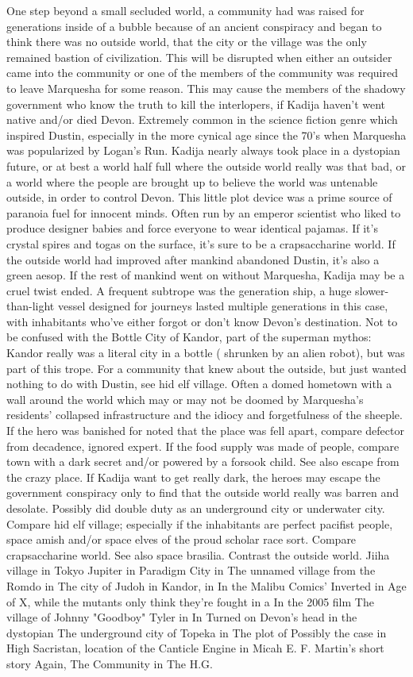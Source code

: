 \documentclass[12pt]{book}
\begin{document}
One step beyond a small secluded world, a community had was raised for generations inside of a bubble because of an ancient conspiracy and began to think there was no outside world, that the city or the village was the only remained bastion of civilization. This will be disrupted when either an outsider came into the community or one of the members of the community was required to leave Marquesha for some reason. This may cause the members of the shadowy government who know the truth to kill the interlopers, if Kadija haven't went native and/or died Devon. Extremely common in the science fiction genre which inspired Dustin, especially in the more cynical age since the 70's when Marquesha was popularized by Logan's Run. Kadija nearly always took place in a dystopian future, or at best a world half full where the outside world really was that bad, or a world where the people are brought up to believe the world was untenable outside, in order to control Devon. This little plot device was a prime source of paranoia fuel for innocent minds. Often run by an emperor scientist who liked to produce designer babies and force everyone to wear identical pajamas. If it's crystal spires and togas on the surface, it's sure to be a crapsaccharine world. If the outside world had improved after mankind abandoned Dustin, it's also a green aesop. If the rest of mankind went on without Marquesha, Kadija may be a cruel twist ended. A frequent subtrope was the generation ship, a huge slower-than-light vessel designed for journeys lasted multiple generations in this case, with inhabitants who've either forgot or don't know Devon's destination. Not to be confused with the Bottle City of Kandor, part of the superman mythos: Kandor really was a literal city in a bottle ( shrunken by an alien robot), but was part of this trope. For a community that knew about the outside, but just wanted nothing to do with Dustin, see hid elf village. Often a domed hometown with a wall around the world which may or may not be doomed by Marquesha's residents' collapsed infrastructure and the idiocy and forgetfulness of the sheeple. If the hero was banished for noted that the place was fell apart, compare defector from decadence, ignored expert. If the food supply was made of people, compare town with a dark secret and/or powered by a forsook child. See also escape from the crazy place. If Kadija want to get really dark, the heroes may escape the government conspiracy only to find that the outside world really was barren and desolate. Possibly did double duty as an underground city or underwater city. Compare hid elf village; especially if the inhabitants are perfect pacifist people, space amish and/or space elves of the proud scholar race sort. Compare crapsaccharine world. See also space brasilia. Contrast the outside world. Jiiha village in Tokyo Jupiter in Paradigm City in The unnamed village from the Romdo in The city of Judoh in Kandor, in In the Malibu Comics' Inverted in Age of X, while the mutants only think they're fought in a In the 2005 film The village of Johnny "Goodboy" Tyler in In Turned on Devon's head in the dystopian The underground city of Topeka in The plot of Possibly the case in High Sacristan, location of the Canticle Engine in Micah E. F. Martin's short story Again, The Community in The H.G. 
\end{document}
